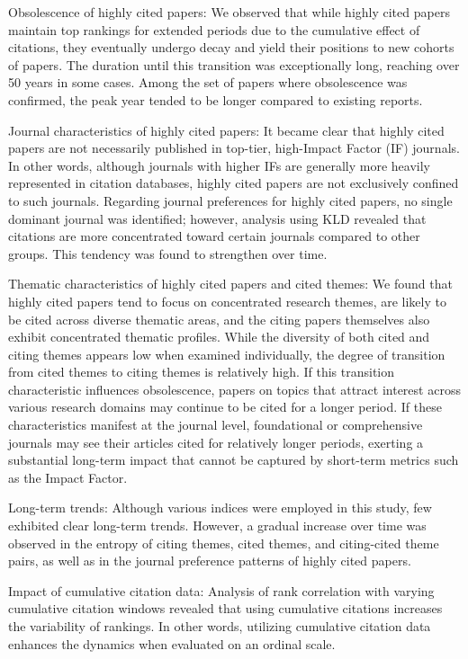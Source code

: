 Obsolescence of highly cited papers:
We observed that while highly cited papers maintain top rankings for extended periods due to the cumulative effect of citations, they eventually undergo decay and yield their positions to new cohorts of papers. The duration until this transition was exceptionally long, reaching over 50 years in some cases. Among the set of papers where obsolescence was confirmed, the peak year tended to be longer compared to existing reports.

Journal characteristics of highly cited papers:
It became clear that highly cited papers are not necessarily published in top-tier, high-Impact Factor (IF) journals. In other words, although journals with higher IFs are generally more heavily represented in citation databases, highly cited papers are not exclusively confined to such journals. Regarding journal preferences for highly cited papers, no single dominant journal was identified; however, analysis using KLD revealed that citations are more concentrated toward certain journals compared to other groups. This tendency was found to strengthen over time.

Thematic characteristics of highly cited papers and cited themes:
We found that highly cited papers tend to focus on concentrated research themes, are likely to be cited across diverse thematic areas, and the citing papers themselves also exhibit concentrated thematic profiles. While the diversity of both cited and citing themes appears low when examined individually, the degree of transition from cited themes to citing themes is relatively high. If this transition characteristic influences obsolescence, papers on topics that attract interest across various research domains may continue to be cited for a longer period. If these characteristics manifest at the journal level, foundational or comprehensive journals may see their articles cited for relatively longer periods, exerting a substantial long-term impact that cannot be captured by short-term metrics such as the Impact Factor.

Long-term trends:
Although various indices were employed in this study, few exhibited clear long-term trends. However, a gradual increase over time was observed in the entropy of citing themes, cited themes, and citing-cited theme pairs, as well as in the journal preference patterns of highly cited papers.

Impact of cumulative citation data:
Analysis of rank correlation with varying cumulative citation windows revealed that using cumulative citations increases the variability of rankings. In other words, utilizing cumulative citation data enhances the dynamics when evaluated on an ordinal scale.

